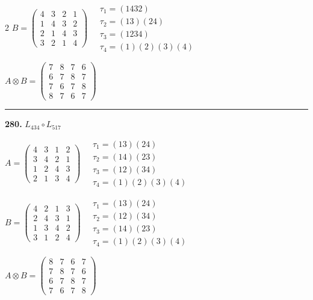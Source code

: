 \begin{multicols}{2}
$B = \begin{pmatrix} 4 & 3 & 2 & 1 \\ 1 & 4 & 3 & 2 \\ 2 & 1 & 4 & 3 \\ 3 & 2 & 1 & 4 \end{pmatrix} \quad \begin{matrix} \tau_{1}=(1 4 3 2) \\ \tau_{2}=(1 3)(2 4) \\ \tau_{3}=(1 2 3 4) \\ \tau_{4}=(1)(2)(3)(4) \end{matrix}$

$A \otimes B = \begin{pmatrix} 7 & 8 & 7 & 6 \\ 6 & 7 & 8 & 7 \\ 7 & 6 & 7 & 8 \\ 8 & 7 & 6 & 7 \end{pmatrix}$

\vspace{0.3em}
\hrule
\vspace{0.3em}

\noindent\textbf{280.} $L_{434} \circ L_{517}$

$A = \begin{pmatrix} 4 & 3 & 1 & 2 \\ 3 & 4 & 2 & 1 \\ 1 & 2 & 4 & 3 \\ 2 & 1 & 3 & 4 \end{pmatrix} \quad \begin{matrix} \tau_{1}=(1 3)(2 4) \\ \tau_{2}=(1 4)(2 3) \\ \tau_{3}=(1 2)(3 4) \\ \tau_{4}=(1)(2)(3)(4) \end{matrix}$

$B = \begin{pmatrix} 4 & 2 & 1 & 3 \\ 2 & 4 & 3 & 1 \\ 1 & 3 & 4 & 2 \\ 3 & 1 & 2 & 4 \end{pmatrix} \quad \begin{matrix} \tau_{1}=(1 3)(2 4) \\ \tau_{2}=(1 2)(3 4) \\ \tau_{3}=(1 4)(2 3) \\ \tau_{4}=(1)(2)(3)(4) \end{matrix}$

$A \otimes B = \begin{pmatrix} 8 & 7 & 6 & 7 \\ 7 & 8 & 7 & 6 \\ 6 & 7 & 8 & 7 \\ 7 & 6 & 7 & 8 \end{pmatrix}$


\end{multicols}
